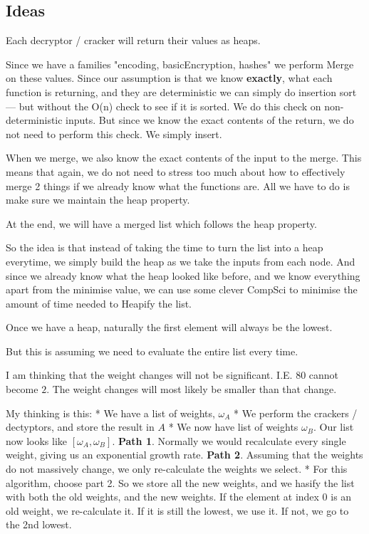 \documentclass{article}
\theoremstyle{definition}
\begin{document}
\subsection{Ideas}
Each decryptor / cracker will return their values as heaps.

Since we have a families "encoding, basicEncryption, hashes" we perform Merge on these values.
Since our assumption is that we know \textbf{exactly}, what each function is returning, and they are deterministic we can simply do insertion sort --- but without the O(n) check to see if it is sorted. We do this check on non-deterministic inputs. But since we know the exact contents of the return, we do not need to perform this check. We simply insert.

When we merge, we also know the exact contents of the input to the merge. This means that again, we do not need to stress too much about how to effectively merge 2 things if we already know what the functions are. All we have to do is make sure we maintain the heap property.

At the end, we will have a merged list which follows the heap property.

So the idea is that instead of taking the time to turn the list into a heap everytime, we simply build the heap as we take the inputs from each node. And since we already know what the heap looked like before, and we know everything apart from the minimise value, we can use some clever CompSci to minimise the amount of time needed to Heapify the list.

Once we have a heap, naturally the first element will always be the lowest. 

But this is assuming we need to evaluate the entire list every time. 

I am thinking that the weight changes will not be significant. I.E. $80$ cannot become $2$. The weight changes will most likely be smaller than that change.

My thinking is this:
* We have a list of weights, $\omega_A$
* We perform the crackers / dectyptors, and store the result in $A$
* We now have list of weights $\omega_B$. Our list now looks like $[\omega_A, \omega_B]$.
\textbf{Path 1}. Normally we would recalculate every single weight, giving us an exponential growth rate.
\textbf{Path 2}. Assuming that the weights do not massively change, we only re-calculate the weights we select.
* For this algorithm, choose part 2. So we store all the new weights, and we hasify the list with both the old weights, and the new weights. If the element at index 0 is an old weight, we re-calculate it. If it is still the lowest, we use it. If not, we go to the 2nd lowest.
\end{document}
